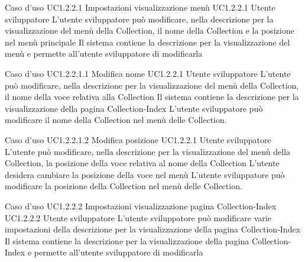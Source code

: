 \UCtitle
{Caso d'uso UC1.2.2.1}
{Impostazioni visualizzazione menù}
\UC
{UC1.2.2.1}
{Utente sviluppatore}
{L'utente sviluppatore può modificare, nella descrizione per la visualizzazione del menù della Collection, il nome della Collection e la posizione nel menù principale}
{Il sistema contiene la descrizione per la visualizzazione del menù e permette all'utente sviluppatore di modificarla}

\UCtitle
{Caso d'uso UC1.2.2.1.1}
{Modifica nome}
\UC
{UC1.2.2.1}
{Utente sviluppatore}
{L'utente può modificare, nella descrizione per la visualizzazione del menù della Collection, il nome della voce relativa alla Collection}
{Il sistema contiene la descrizione per la visualizzazione della pagina Collection-Index}
\scenario
{L'utente sviluppatore può modificare il nome della Collection nel menù delle Collection.}

\UCtitle
{Caso d'uso UC1.2.2.1.2}
{Modifica posizione}
\UC
{UC1.2.2.1}
{Utente sviluppatore}
{L'utente può modificare, nella descrizione per la visualizzazione del menù della Collection, la posizione della voce relativa al nome della Collection}
{L'utente desidera cambiare la posizione della voce nel menù}
\scenario
{L'utente sviluppatore può modificare la posizione della Collection nel menù delle Collection.}

\UCtitle
{Caso d'uso UC1.2.2.2}
{Impostazioni visualizzazione pagina Collection-Index}
\UC
{UC1.2.2.2}
{Utente sviluppatore}
{L'utente sviluppatore  può modificare varie impostazioni della descrizione per la visualizzazione della pagina Collection-Index}
{Il sistema contiene la descrizione per la visualizzazione della pagina Collection-Index e permette all'utente sviluppatore di modificarla}

